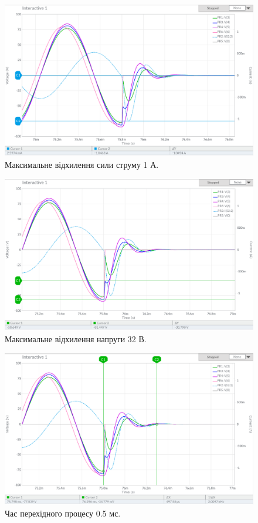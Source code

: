 \documentclass{article}
\begin{document}
\begin{normalsize}
	\begin{figure}[H]
		\centering
		\includegraphics[width=\textwidth]{223}
		\caption{Максимальне відхилення сили струму 1 А.}
	\end{figure}
	
	\begin{figure}[H]
		\centering
		\includegraphics[width=\textwidth]{222}
		\caption{Максимальне відхилення напруги 32 В.}
	\end{figure}
	
	\begin{figure}[H]
		\centering
		\includegraphics[width=\textwidth]{221}
		\caption{Час перехідного процесу 0.5 мс.}
	\end{figure}


\end{normalsize}
\end{document}

